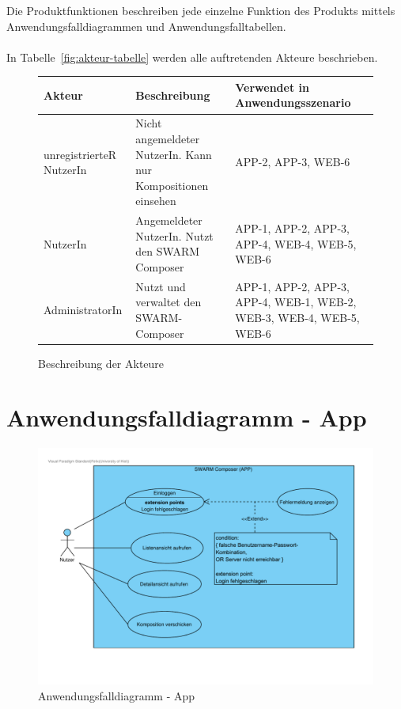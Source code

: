 Die Produktfunktionen beschreiben jede einzelne Funktion des Produkts mittels Anwendungsfalldiagrammen und Anwendungsfalltabellen.
\\\\
In  Tabelle~\autoref{fig:akteur-tabelle} werden alle auftretenden Akteure beschrieben.


\begin{figure}[h]
	\centering

	\begin{tabularx}{\textwidth}{ p{} | p{} | X }
		\textbf{Akteur} & \textbf{Beschreibung} & \textbf{Verwendet in Anwendungsszenario} \\ \hline
		unregistrierteR NutzerIn & Nicht angemeldeter NutzerIn. Kann nur Kompositionen einsehen & APP-2, APP-3, WEB-6
		\\ \hline NutzerIn & Angemeldeter NutzerIn. Nutzt den SWARM Composer & APP-1, APP-2, APP-3, APP-4, WEB-4, WEB-5, WEB-6
		\\ \hline AdministratorIn & Nutzt und verwaltet den SWARM-Composer & APP-1, APP-2, APP-3, APP-4, WEB-1, WEB-2, WEB-3, WEB-4, WEB-5, WEB-6
	\end{tabularx}

	\caption{Beschreibung der Akteure}
	\label{fig:akteur-tabelle}
\end{figure}


\newpage

\section{Anwendungsfalldiagramm - App}

\begin{figure}[h]
	\centering	
	\includegraphics[width=\textwidth]{img/Produktfunktionen_app}	
	\caption{Anwendungsfalldiagramm - App}
	\label{fig:anwendungsfalldiagramm-app}
\end{figure}

